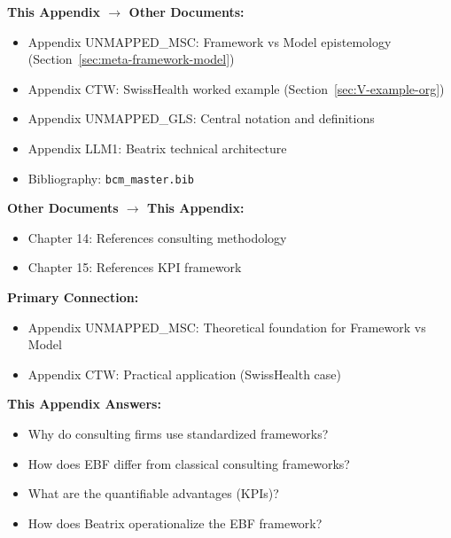 
\begin{tcolorbox}[colback=gray!5!white, colframe=gray!75!black,
    title=\textbf{Cross-Reference Map}]

\textbf{This Appendix $\rightarrow$ Other Documents:}
\begin{itemize}[nosep]
    \item Appendix UNMAPPED_MSC: Framework vs Model epistemology (Section~\ref{sec:meta-framework-model})
    \item Appendix CTW: SwissHealth worked example (Section~\ref{sec:V-example-org})
    \item Appendix UNMAPPED_GLS: Central notation and definitions
    \item Appendix LLM1: Beatrix technical architecture
    \item Bibliography: \texttt{bcm\_master.bib}
\end{itemize}

\textbf{Other Documents $\rightarrow$ This Appendix:}
\begin{itemize}[nosep]
    \item Chapter 14: References consulting methodology
    \item Chapter 15: References KPI framework
\end{itemize}

\end{tcolorbox}

\begin{tcolorbox}[colback=purple!5!white, colframe=purple!75!black,
    title=Chapter Linkage]

\textbf{Primary Connection:}
\begin{itemize}[nosep]
\item Appendix UNMAPPED_MSC: Theoretical foundation for Framework vs Model
\item Appendix CTW: Practical application (SwissHealth case)
\end{itemize}

\textbf{This Appendix Answers:}
\begin{itemize}[nosep]
\item Why do consulting firms use standardized frameworks?
\item How does EBF differ from classical consulting frameworks?
\item What are the quantifiable advantages (KPIs)?
\item How does Beatrix operationalize the EBF framework?
\end{itemize}

\end{tcolorbox}

